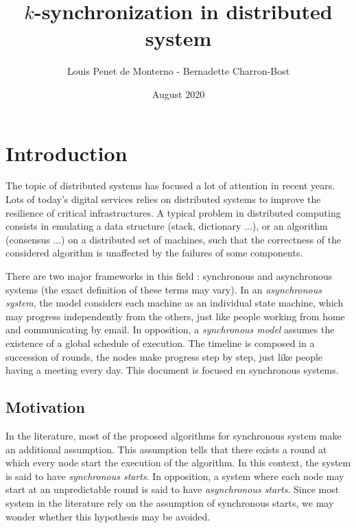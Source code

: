 \documentclass{article}
\title{$k$-synchronization in distributed system}
\date{August 2020}
\author{Louis Penet de Monterno - Bernadette Charron-Bost}
\begin{document}
\maketitle

\section{Introduction}

The topic of distributed systems has focused a lot of attention in recent years.
Lots of today's digital services relies on distributed systems to improve the resilience of critical infrastructures.
A typical problem in distributed computing consists in emulating a data structure (stack, dictionary ...), or an algorithm (consensus ...) on a distributed
set of machines, such that the correctness of the considered algorithm is unaffected by the failures of some components.

There are two major frameworks in this field : synchronous and asynchronous systems (the exact definition of these terms may vary).
In an \emph{asynchronous system}, the model considers each machine as an individual state machine, which may progress independently from the others,
just like people working from home and communicating by email.
In opposition, a \emph{synchronous model} assumes the existence of a global schedule of execution.
The timeline is composed in a succession of rounds, the nodes make progress step by step,
just like people having a meeting every day.
This document is focused en synchronous systems.


\subsection{Motivation}

In the literature, most of the proposed algorithms for synchronous system make an additional assumption.
This assumption tells that there exists a round at which every node start the execution of the algorithm.
In this context, the system is said to have \emph{synchronous starts}.
In opposition, a system where each node may start at an unpredictable round is said to have \emph{asynchronous starts}.
Since most system in the literature rely on the assumption of synchronous starts, we may wonder whether this hypothesis may be avoided.
\end{document}
